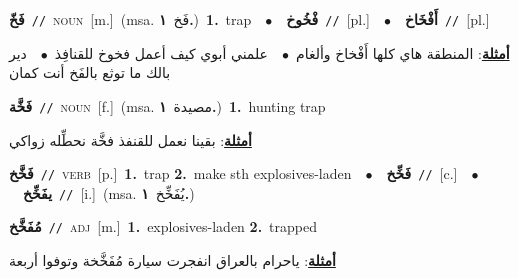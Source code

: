 \documentclass[10pt,a4paper,twoside]{article} %
\begin{document}
\begin{multicols}{2}
{\setlength\topsep{0pt}\textbf{\foreignlanguage{arabic}{فَخّ}}\ {\color{gray}\texttt{//}\color{black}}\ \textsc{noun}\ [m.]\ \color{gray}(msa. \foreignlanguage{arabic}{فَخ}~\foreignlanguage{arabic}{\textbf{١.}})\color{black}\ \textbf{1.}~trap\ \ $\bullet$\ \ \setlength\topsep{0pt}\textbf{\foreignlanguage{arabic}{فْخُوخ}}\ {\color{gray}\texttt{//}\color{black}}\ [pl.]\ \ $\bullet$\ \ \setlength\topsep{0pt}\textbf{\foreignlanguage{arabic}{أَفْخَاخ}}\ {\color{gray}\texttt{//}\color{black}}\ [pl.]\  \begin{flushright}\color{gray}\foreignlanguage{arabic}{\textbf{\underline{\foreignlanguage{arabic}{أمثلة}}}: المنطقة هاي كلها أَفْخاخ وألغام\ $\bullet$\ \  علمني أبوي كيف أعمل فخوخ للقنافِذ\ $\bullet$\ \  دير بالك ما توثع بالفَخ أنت كمان}\end{flushright}\color{black}} \vspace{2mm}

{\setlength\topsep{0pt}\textbf{\foreignlanguage{arabic}{فَخَّة}}\ {\color{gray}\texttt{//}\color{black}}\ \textsc{noun}\ [f.]\ \color{gray}(msa. \foreignlanguage{arabic}{مصيدة}~\foreignlanguage{arabic}{\textbf{١.}})\color{black}\ \textbf{1.}~hunting trap\  \begin{flushright}\color{gray}\foreignlanguage{arabic}{\textbf{\underline{\foreignlanguage{arabic}{أمثلة}}}: بقينا نعمل للقنفذ فخَّة نحطِّله زواكي}\end{flushright}\color{black}} \vspace{2mm}

{\setlength\topsep{0pt}\textbf{\foreignlanguage{arabic}{فَخَّخ}}\ {\color{gray}\texttt{//}\color{black}}\ \textsc{verb}\ [p.]\ \textbf{1.}~trap  \textbf{2.}~make sth explosives-laden\ \ $\bullet$\ \ \setlength\topsep{0pt}\textbf{\foreignlanguage{arabic}{فَخِّخ}}\ {\color{gray}\texttt{//}\color{black}}\ [c.]\ \ $\bullet$\ \ \setlength\topsep{0pt}\textbf{\foreignlanguage{arabic}{يفَخِّخ}}\ {\color{gray}\texttt{//}\color{black}}\ [i.]\ \color{gray}(msa. \foreignlanguage{arabic}{يُفَخِّخ}~\foreignlanguage{arabic}{\textbf{١.}})\color{black}\ } \vspace{2mm}

{\setlength\topsep{0pt}\textbf{\foreignlanguage{arabic}{مُفَخَّخ}}\ {\color{gray}\texttt{//}\color{black}}\ \textsc{adj}\ [m.]\ \textbf{1.}~explosives-laden  \textbf{2.}~trapped\  \begin{flushright}\color{gray}\foreignlanguage{arabic}{\textbf{\underline{\foreignlanguage{arabic}{أمثلة}}}: ياحرام بالعراق انفجرت سيارة مُفَخَّخة وتوفوا أربعة}\end{flushright}\color{black}} \vspace{2mm}


\end{multicols}
\end{document}
